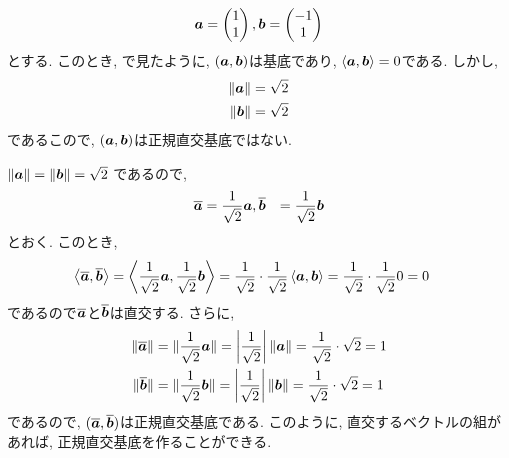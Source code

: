 \begin{example}
  \label{ex:orth:nonnormal:basis}
  \begin{align*}
    \boldsymbol{a}=
    \begin{pmatrix}
      1\\1
    \end{pmatrix},
    \boldsymbol{b}=
    \begin{pmatrix}
      -1\\1
    \end{pmatrix}
  \end{align*}
  とする.
  このとき,
  で見たように,
  $(\boldsymbol{a},\boldsymbol{b})$は基底であり,
  $\Braket{\boldsymbol{a},\boldsymbol{b}}=0$である.
  しかし,
  \begin{align*}
    \|\boldsymbol{a}\|&=\sqrt{2}\\
    \|\boldsymbol{b}\|&=\sqrt{2}
  \end{align*}
  であるこので, $(\boldsymbol{a},\boldsymbol{b})$は正規直交基底ではない.

  $\|\boldsymbol{a}\|=\|\boldsymbol{b}\|=\sqrt{2}$
  であるので,  
  \begin{align*}
    \overline{\boldsymbol{a}}&=\frac{1}{\sqrt{2}}\boldsymbol{a},
    \overline{\boldsymbol{b}}&=\frac{1}{\sqrt{2}}\boldsymbol{b}
  \end{align*}
  とおく.
  このとき,
  \begin{align*}
    \Braket{\overline{\boldsymbol{a}},\overline{\boldsymbol{b}}}&=
    \Braket{\frac{1}{\sqrt{2}}\boldsymbol{a},\frac{1}{\sqrt{2}}\boldsymbol{b}}
    =\frac{1}{\sqrt{2}}\cdot \frac{1}{\sqrt{2}}\Braket{\boldsymbol{a},\boldsymbol{b}}
    =\frac{1}{\sqrt{2}}\cdot \frac{1}{\sqrt{2}}0=0
  \end{align*}
  であるので$\overline{\boldsymbol{a}}$と$\overline{\boldsymbol{b}}$は直交する.
  さらに,
  \begin{align*}
    \|\overline{\boldsymbol{a}}\|&=
    \|\frac{1}{\sqrt{2}}\boldsymbol{a}\|
    =\left|\frac{1}{\sqrt{2}}\right|\|\boldsymbol{a}\|
    =\frac{1}{\sqrt{2}}\cdot \sqrt{2}=1\\
    \|\overline{\boldsymbol{b}}\|&=
    \|\frac{1}{\sqrt{2}}\boldsymbol{b}\|
    =\left|\frac{1}{\sqrt{2}}\right|\|\boldsymbol{b}\|
    =\frac{1}{\sqrt{2}}\cdot \sqrt{2}=1
  \end{align*}
  であるので, $(\overline{\boldsymbol{a}},\overline{\boldsymbol{b}})$は正規直交基底である.
  このように, 直交するベクトルの組があれば, 正規直交基底を作ることができる.
\end{example}

